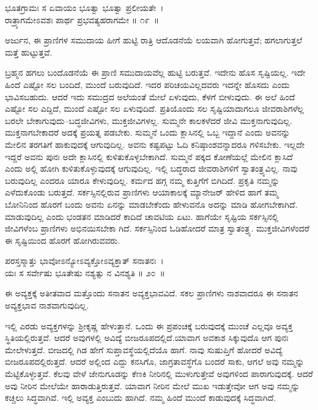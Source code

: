 \begin{shloka}
ಭೂತಗ್ರಾಮಃ ಸ ಏವಾಯಂ ಭೂತ್ವಾ ಭೂತ್ವಾ ಪ್ರಲೀಯತೇ~।\\ರಾತ್ರ್ಯಾಗಮೇಽವಶಃ ಪಾರ್ಥ ಪ್ರಭವತ್ಯಹರಾಗಮೇ \hfill॥ ೧೯~॥
\end{shloka}

\begin{artha}
ಅರ್ಜುನ, ಈ ಪ್ರಾಣಿಗಳ ಸಮುದಾಯ ಹೀಗೆ ಹುಟ್ಟಿ ರಾತ್ರಿ ಆದೊಡನೆಯೆ ಲಯವಾಗಿ ಹೋಗುತ್ತವೆ; ಹಗಲಾಗುತ್ತಲೆ ಮತ್ತೆ ಹುಟ್ಟುತ್ತವೆ.
\end{artha}

ಬ್ರಹ್ಮನ ಹಗಲು ಬಂದೊಡನೆಯೆ ಈ ಪ್ರಾಣಿ ಸಮುದಾಯವೆಲ್ಲ ಹುಟ್ಟಿ ಬರುತ್ತವೆ. ಇದೇನು ಹೊಸ ಸೃಷ್ಟಿಯಲ್ಲ. ಇದೇ ಹಿಂದೆ ಎಷ್ಟೋ ಸಲ ಬಂದಿದೆ, ಮುಂದೆ ಬರುವುದಿದೆ. ಇದರ ಪರಿಚಯವಿಲ್ಲದವರು ಇದನ್ನೇ ಹೊಸದು ಎಂದು ಭಾವಿಸಬಹುದು. ಆದರೆ ಇದು ಸಮುದ್ರದ ಅಲೆಯಂತೆ ಮೇಲೆ ಏಳುವುದು, ಕೆಳಗೆ ಬೀಳುವುದು. ಈ ಅಲೆ ಹಿಂದೆ ಎಷ್ಟೋ ಸಲ ಎದ್ದಿದೆ, ಮುಂದೆ ಎಷ್ಟೋ ಸಲ ಏಳುವುದಿದೆ. ಪ್ರತಿಯೊಂದು ಸಲ ಸೃಷ್ಟಿಯಾದಾಗಲೂ ಜೀವರಾಶಿಗಳೆಲ್ಲ ಬರಲೇ ಬೇಕಾಗುವುದು–ಬದ್ಧಜೀವಿಗಳು, ಮುಕ್ತಜೀವಿಗಳಲ್ಲ. ಸುಮ್ಮನೇ ಕಾಲಕಳೆದರೆ ಜೀವಿ ಮುಕ್ತನಾಗುವುದಿಲ್ಲ. ಮುಕ್ತನಾಗಬೇಕಾದರೆ ಅದಕ್ಕೆ ಪ್ರಯತ್ನ ಪಡಬೇಕು. ಸುಮ್ಮನೆ ಒಂದು ಕ್ಲಾಸಿನಲ್ಲಿ ಒಬ್ಬ ಇದ್ದಾನೆ ಎಂದು ಅವನನ್ನು ಮೇಲಿನ ತರಗತಿಗೆ ಹಾಕುವುದಕ್ಕೆ ಆಗುವುದಿಲ್ಲ. ಅವನು ಕಷ್ಟಪಟ್ಟು ಓದಿ ಕನಿಷ್ಠಾಂಶವನ್ನಾದರೂ ಗಳಿಸಬೇಕು. ಇಲ್ಲದೇ ಇದ್ದರೆ ಅವನು ಪುನಃ ಅದೇ ಕ್ಲಾಸಿನಲ್ಲಿ ಕುಳಿತುಕೊಳ್ಳಬೇಕಾಗಿದೆ. ಸುಮ್ಮನೆ ಪಕ್ಕದ ಕೋಣೆಯಲ್ಲೆ ಮೇಲಿನ ಕ್ಲಾಸಿದೆ ಎಂದು ಅಲ್ಲಿ ಹೋಗಿ ಕುಳಿತುಕೊಳ್ಳುವುದಕ್ಕೆ ಆಗುವುದಿಲ್ಲ. ಇಲ್ಲಿ ಬದ್ಧರಾದ ಜೀವರಾಶಿಗಳಿಗೆ ಸ್ವಾತಂತ್ರ್ಯವಿಲ್ಲ. ನಾವು ಬರುವುದಿಲ್ಲ ಎಂದರೂ ಯಾರೂ ಕೇಳುವುದಿಲ್ಲ. ಕರ್ಮದ ಹಗ್ಗ ನಮ್ಮ ಕುತ್ತಿಗೆಗೆ ಬಿಗಿದಿದೆ. ಪ್ರಕೃತಿ ನಮ್ಮನ್ನು ಎಳೆದುಕೊಂಡು ಬರುತ್ತದೆ. ಸರ್ಕಸ್ಸಿನಲ್ಲಿರುವ ಪ್ರಾಣಿಗಳು ಆಯಾಕಾಲಕ್ಕೆ ಮ್ಯಾನೇಜರ್ ಹೇಳಿದ ಹಾಗೆ ತಮ್ಮ ಬೋನಿನಿಂದ ಹೊರಗೆ ಬಂದು ಅವನು ಏನನ್ನು ಮಾಡಬೇಕೆಂದು ಹೇಳುವನೊ ಅದನ್ನು ಮಾಡಿ ಹೋಗಬೇಕಾಗಿದೆ. ಮಾಡುವುದಿಲ್ಲ ಎಂದು ಭಂಡತನ ಮಾಡಿದರೆ ಕಾದಿದೆ ಚಾವಟಿಯ ಏಟು. ಹಾಗೆಯೇ ಸೃಷ್ಟಿಯ ಸರ್ಕಸ್ಸಿನಲ್ಲಿ ಜೀವಿಗಳೆಂಬ ಪ್ರಾಣಿಗಳು ಅಭಿನಯಿಸಬೇಕಾ ಗಿದೆ. ಸರ್ಕಸ್ಸಿನಿಂದ ಓಡಿಹೋದರೆ ಮಾತ್ರ ಸ್ವಾತಂತ್ರ್ಯ. ಮುಕ್ತಜೀವಿಗಳೆಂದರೆ ಈ ಸೃಷ್ಟಿಯಿಂದ ಹೊರಗೆ ಹೋಗಿರುವವರು.

\begin{shloka}
ಪರಸ್ತಸ್ಮಾತ್ತು ಭಾವೋಽನ್ಯೋಽವ್ಯಕ್ತೋಽವ್ಯಕ್ತಾತ್ ಸನಾತನಃ~।\\ಯಃ ಸ ಸರ್ವೇಷು ಭೂತೇಷು ನಶ್ಯತ್ಸು ನ ವಿನಶ್ಯತಿ \hfill॥ ೨೦~॥
\end{shloka}

\begin{artha}
ಈ ಅವ್ಯಕ್ತಕ್ಕೆ ಅತೀತವಾದ ಮತ್ತೊಂದು ಸನಾತನ ಅವ್ಯಕ್ತಭಾವವಿದೆ. ಸಕಲ ಪ್ರಾಣಿಗಳು ನಾಶವಾದರೂ ಈ ಸನಾತನ ಅವ್ಯಕ್ತಭಾವ ನಾಶವಾಗುವುದಿಲ್ಲ.
\end{artha}

ಇಲ್ಲಿ ಎರಡು ಅವ್ಯಕ್ತಗಳನ್ನು ಶ‍್ರೀಕೃಷ್ಣ ಹೇಳುತ್ತಾನೆ. ಒಂದು ಈ ಪ್ರಪಂಚಕ್ಕೆ ಬರುವುದಕ್ಕೆ ಮುಂಚೆ ಎಲ್ಲವೂ ಅವ್ಯಕ್ತ ಸ್ಥಿತಿಯಲ್ಲಿರುತ್ತವೆ. ಆದರೆ ಅವುಗಳಲ್ಲಿ ಅವಿದ್ಯೆ ಬೀಜರೂಪದಲ್ಲಿದೆ.\break ಯಾವಾಗ ಅವಕಾಶ ಸಿಕ್ಕುವುದೊ ಆಗ ಪುನಃ ಮೇಲೇಳುತ್ತದೆ. ಬೀಜದಲ್ಲಿ ಗಿಡ ಹೇಗೆ ಸುಪ್ತಾವಸ್ಥೆ\-ಯಲ್ಲಿದೆಯೊ ಹಾಗೆ. ನಾವು ಸುಷುಪ್ತಿಗೆ ಹೋದರೆ ಅವಿದ್ಯೆ ಬೀಜರೂಪದಲ್ಲಿರುತ್ತದೆ. ಆದರೆ ಅಲ್ಲಿಂದ ಎದ್ದು ಕನಸಿಗೊ, ಜಾಗ್ರತಾವಸ್ಥೆಗೊ ಬಂದರೆ ಸಾಕು, ಆಗಲೆ ಅವು ನಮ್ಮನ್ನು ಮೆಟ್ಟಿಕೊಳ್ಳುತ್ತವೆ. ಕೆಲವು ವೇಳೆ ಜೇನುಗೂಡನ್ನು ಕೆಣಕಿ ನೀರಿನಲ್ಲಿ ಮುಳುಗುತ್ತೇವೆ ಅವುಗಳಿಂದ ಪಾರಾಗುವುದಕ್ಕೆ. ಆದರೆ ಅವು ನೀರಿನ ಮೇಲೆಯೇ ಹಾರಾಡುತ್ತಿರುತ್ತವೆ. ಯಾವಾಗ ನೀರಿನ ಮೇಲೆ ಮುಖ ಇಡುತ್ತೇವೋ ಆಗ ಅವು ನಮ್ಮನ್ನು ಕಚ್ಚಲು ಸಿದ್ಧವಾಗಿವೆ. ಇಲ್ಲಿ ಅವ್ಯಕ್ತ ಎಂಬುದು ಹಾಗಿದೆ. ನಮ್ಮ ಹಿಂದೆ ಮುಂದೆ ಕಾಡುವುದಕ್ಕೆ ಸಿದ್ಧವಾಗಿದೆ.

